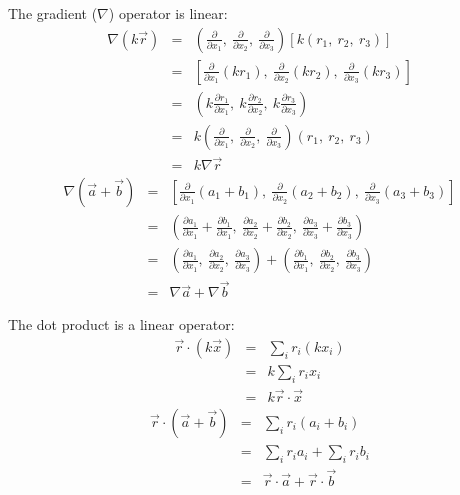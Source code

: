 The gradient ($\nabla$) operator is linear:
\begin{eqnarray}
\nabla (k \vec r) & = & \left (\frac{\partial}{\partial x_1}, ~
	\frac{\partial}{\partial x_2}, ~ \frac{\partial}{\partial x_3}
	\right ) \left [k (r_1, ~ r_2, ~ r_3) \right ] \\
	& = & \left [\frac{\partial}{\partial x_1} (k r_1), 
	~ \frac{\partial}{\partial x_2} (k r_2), 
	~ \frac{\partial}{\partial x_3}	(k r_3) \right ] \\
	& = & \left (k \frac{\partial r_1}{\partial x_1} , 
	~ k \frac{\partial r_2}{\partial x_2}, 
	~ k \frac{\partial r_3}{\partial x_3} \right ) \\
& = & k \left (\frac{\partial}{\partial x_1}, ~
	\frac{\partial}{\partial x_2}, ~ \frac{\partial}{\partial x_3}
	\right ) (r_1, ~ r_2, ~ r_3) \\
	& = & k \nabla \vec r
\end{eqnarray}
\begin{eqnarray}
\nabla (\vec a + \vec b) 
& = & \left [\frac{\partial}{\partial x_1} (a_1 + b_1), ~
\frac{\partial}{\partial x_2} (a_2 + b_2), 
~ \frac{\partial}{\partial x_3} (a_3 + b_3)
	\right ]\\
	& = & \left (\frac{\partial a_1}{\partial x_1}
	+ \frac{\partial b_1}{\partial x_1},
	~ \frac{\partial a_2}{\partial x_2} 
	+ \frac{\partial b_2}{\partial x_2},
	~ \frac{\partial a_3}{\partial x_3} 
	+ \frac{\partial b_3}{\partial x_3} \right ) \\
	& = & \left (\frac{\partial a_1}{\partial x_1},
	~ \frac{\partial a_2}{\partial x_2},
	~ \frac{\partial a_3}{\partial x_3} \right ) + 
	\left ( \frac{\partial b_1}{\partial x_1},
	~ \frac{\partial b_2}{\partial x_2},
	~ \frac{\partial b_3}{\partial x_3} \right ) \\
	& = & \nabla \vec a + \nabla \vec b
\end{eqnarray}

The dot product is a linear operator:
\begin{eqnarray}
	\vec r \cdot (k \vec x) & = & \sum_i r_i (k x_i) \\
			     & = & k \sum_i r_i x_i \\
	       & = & k \vec r \cdot \vec x
\end{eqnarray}
\begin{eqnarray}
	\vec r \cdot (\vec a + \vec b) & = & \sum_i r_i (a_i+b_i) \\
			     & = & \sum_i r_i a_i + \sum_i r_i b_i \\
	       & = & \vec r \cdot \vec a + \vec r \cdot \vec b
\end{eqnarray}

